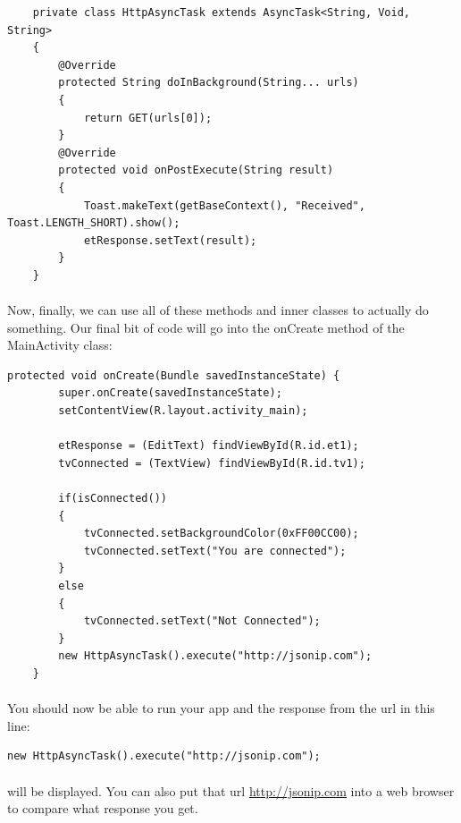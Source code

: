 \begin{lstlisting}
    private class HttpAsyncTask extends AsyncTask<String, Void, String>
    {
        @Override
        protected String doInBackground(String... urls)
        {
            return GET(urls[0]);
        }
        @Override
        protected void onPostExecute(String result)
        {
            Toast.makeText(getBaseContext(), "Received", Toast.LENGTH_SHORT).show();
            etResponse.setText(result);
        }
    }
\end{lstlisting}

\paragraph{} Now, finally, we can use all of these methods and inner classes to actually do something. Our final bit of code will go into the onCreate method of the MainActivity class:

\begin{lstlisting}
protected void onCreate(Bundle savedInstanceState) {
        super.onCreate(savedInstanceState);
        setContentView(R.layout.activity_main);

        etResponse = (EditText) findViewById(R.id.et1);
        tvConnected = (TextView) findViewById(R.id.tv1);

        if(isConnected())
        {
            tvConnected.setBackgroundColor(0xFF00CC00);
            tvConnected.setText("You are connected");
        }
        else
        {
            tvConnected.setText("Not Connected");
        }
        new HttpAsyncTask().execute("http://jsonip.com");
    }
\end{lstlisting}

\paragraph{} You should now be able to run your app and the response from the url in this line:

\begin{lstlisting}
new HttpAsyncTask().execute("http://jsonip.com");
\end{lstlisting}

\paragraph{} will be displayed. You can also put that url \url{http://jsonip.com} into a web browser to compare what response you get.

